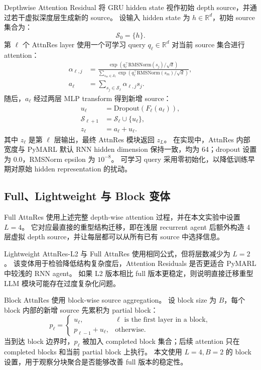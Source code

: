 Depthwise Attention Residual 将 GRU hidden state 视作初始 depth source，并通过若干虚拟深度层生成新的 source。
设输入 hidden state 为 \(h \in \mathbb{R}^{d}\)，初始 source 集合为：
\begin{equation}
  \mathcal{S}_0 = \{h\}.
\end{equation}
第 \(\ell\) 个 AttnRes layer 使用一个可学习 query \(q_\ell \in \mathbb{R}^{d}\) 对当前 source 集合进行 attention：
\begin{align}
  \alpha_{\ell,j}
  &=
  \frac{
    \exp\left(q_\ell^{\top}\mathrm{RMSNorm}(s_j)/\sqrt{d}\right)
  }{
    \sum_{s_m\in\mathcal{S}_{\ell}}
    \exp\left(q_\ell^{\top}\mathrm{RMSNorm}(s_m)/\sqrt{d}\right)
  }, \\
  a_\ell
  &=
  \sum_{s_j\in\mathcal{S}_{\ell}}
  \alpha_{\ell,j}s_j .
\end{align}
随后，\(a_\ell\) 经过两层 MLP transform 得到新增 source：
\begin{align}
  u_\ell &= \mathrm{Dropout}\left(F_\ell(a_\ell)\right), \\
  \mathcal{S}_{\ell+1} &= \mathcal{S}_{\ell} \cup \{u_\ell\}, \\
  z_\ell &= a_\ell + u_\ell .
\end{align}
其中 \(z_\ell\) 是第 \(\ell\) 层输出，最终 AttnRes 模块返回 \(z_L\)。
在实现中，AttnRes 内部宽度与 PyMARL 默认 RNN hidden dimension 保持一致，均为 64；dropout 设置为 0.0，RMSNorm epsilon 为 \(10^{-8}\)。
可学习 query 采用零初始化，以降低训练早期对原始 hidden representation 的扰动。

\subsection{Full、Lightweight 与 Block 变体}

Full AttnRes 使用上述完整 depth-wise attention 过程，并在本文实验中设置 \(L=4\)。
它对应最直接的重型结构迁移，即在浅层 recurrent agent 后额外构造 4 层虚拟 depth source，并让每层都可以从所有已有 source 中选择信息。

Lightweight AttnRes-L2 与 Full AttnRes 使用相同公式，但将层数减少为 \(L=2\)。
该变体用于检验降低结构复杂度后，Attention Residuals 是否更适合 PyMARL 中较浅的 RNN agent。
如果 L2 版本相比 full 版本更稳定，则说明直接迁移重型 LLM 模块可能存在过度复杂化问题。

Block AttnRes 使用 block-wise source aggregation。
设 block size 为 \(B\)，每个 block 内部的新增 source 先累积为 partial block：
\begin{equation}
  p_{\ell} =
  \begin{cases}
    u_\ell, & \ell \text{ is the first layer in a block},\\
    p_{\ell-1}+u_\ell, & \text{otherwise}.
  \end{cases}
\end{equation}
当到达 block 边界时，\(p_\ell\) 被加入 completed block 集合；后续 attention 只在 completed blocks 和当前 partial block 上执行。
本文使用 \(L=4, B=2\) 的 block 设置，用于观察分块聚合是否能够改善 full 版本的稳定性。

